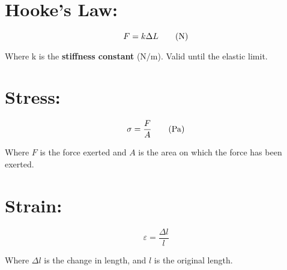 \documentclass[11pt]{article}
\begin{document}
	\makeatletter
	\newcommand\transformxdimension[1]{
		\pgfmathparse{((#1/\pgfplots@x@veclength)+\pgfplots@data@scale@trafo@SHIFT@x)/10^\pgfplots@data@scale@trafo@EXPONENT@x}
	}
	
	\newcommand\transformydimension[1]{
		\pgfmathparse{((#1/\pgfplots@y@veclength)+\pgfplots@data@scale@trafo@SHIFT@y)/10^\pgfplots@data@scale@trafo@EXPONENT@y}
	}
	\makeatother
	
	\newcommand*{\ShowIntersection}{%
		\fill
		[
		name intersections={of=Hardening and Hooke, name=i, total=\t},
		fill=red
		]
		\foreach \s in {1,...,\t}{(i-\s) circle (2pt)
			node [above left] {\s} (i-\s) node [below right] {%
				\pgfgetlastxy{\macrox}{\macroy}
				\transformxdimension{\macrox}
				\pgfmathprintnumber{\pgfmathresult},
				\transformydimension{\macroy}
				\pgfmathprintnumber{\pgfmathresult}}};}
	
	\section{Hooke's Law: } 
	
	\begin{equation}
		F = k \Delta L\tag{\si{\newton}}
	\end{equation}
	
	\begin{center}
		Where k is the \textbf{stiffness constant} ($\si{\newton\per\metre}$). Valid until the elastic limit.
	\end{center}
	
	\section{Stress: }
	\begin{equation}
		\sigma = \frac{F}{A}\tag{\si{\pascal}}
	\end{equation}
	\begin{center}
		Where $F$ is the force exerted and $A$ is the area on which the force has been exerted.
	\end{center}
	
	\section{Strain: }
	\begin{equation}
		\varepsilon = \frac{\Delta l}{l}\tag{Dimension-less}
	\end{equation}
	\begin{center}
		Where $\Delta l$ is the change in length, and $l$ is the original length.
	\end{center}
	
\end{document}
